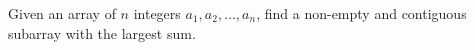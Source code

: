 Given an array of $n$ integers $a_1,a_2,\ldots,a_n$, find a non-empty and contiguous subarray with the largest sum.